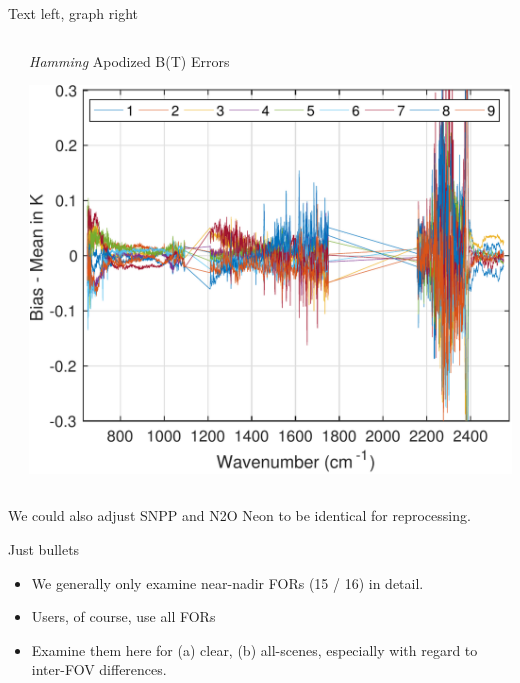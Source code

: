 \documentclass[10pt,t]{beamer}
\begin{document}
\begin{frame}[label={sec:orga1772ec}]{Text left, graph right}
\begin{columns}
\begin{column}{0.55\columnwidth}
\begin{block}{}
        \vspace{-0.2in}
      \end{block}
    \end{column}
    \begin{column}{0.55\columnwidth}
      \begin{block}{\footnotesize \emph{Hamming} Apodized B(T) Errors}
        \begin{center}
          \includegraphics[width=\linewidth]{./testfig.pdf}
        \end{center}
      \end{block}
    \end{column}
  \end{columns}

  We could also adjust SNPP and N2O Neon to be identical for reprocessing.
\end{frame}
\begin{frame}[label={sec:org1a9a034}]{Just bullets}
  \begin{itemize}
  \item We generally only examine near-nadir FORs (15 / 16) in detail.

  \item Users, of course, use all FORs

  \item Examine them here for (a) clear, (b) all-scenes, especially with regard to inter-FOV differences.
  \end{itemize}
\end{frame}
\end{document}
